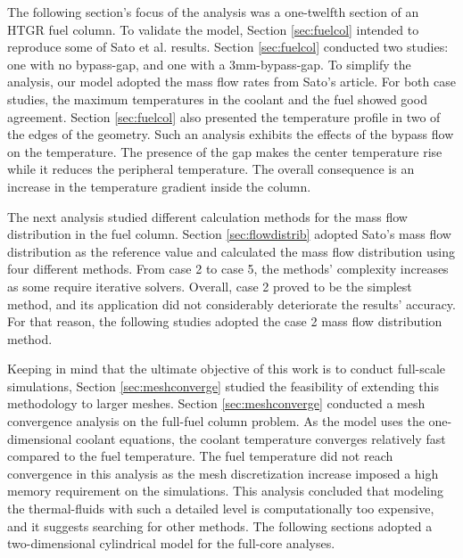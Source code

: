The following section's focus of the analysis was a one-twelfth section of an HTGR fuel column.
To validate the model, Section \ref{sec:fuelcol} intended to reproduce some of Sato et al. \cite{sato_computational_2010} results.
Section \ref{sec:fuelcol} conducted two studies: one with no bypass-gap, and one with a 3mm-bypass-gap.
To simplify the analysis, our model adopted the mass flow rates from Sato's article.
For both case studies, the maximum temperatures in the coolant and the fuel showed good agreement.
Section \ref{sec:fuelcol} also presented the temperature profile in two of the edges of the geometry.
Such an analysis exhibits the effects of the bypass flow on the temperature.
The presence of the gap makes the center temperature rise while it reduces the peripheral temperature.
The overall consequence is an increase in the temperature gradient inside the column.

The next analysis studied different calculation methods for the mass flow distribution in the fuel column.
Section \ref{sec:flowdistrib} adopted Sato's mass flow distribution as the reference value and calculated the mass flow distribution using four different methods.
From case 2 to case 5, the methods' complexity increases as some require iterative solvers.
Overall, case 2 proved to be the simplest method, and its application did not considerably deteriorate the results' accuracy.
For that reason, the following studies adopted the case 2 mass flow distribution method.

Keeping in mind that the ultimate objective of this work is to conduct full-scale simulations, Section \ref{sec:meshconverge} studied the feasibility of extending this methodology to larger meshes.
Section \ref{sec:meshconverge} conducted a mesh convergence analysis on the full-fuel column problem.
As the model uses the one-dimensional coolant equations, the coolant temperature converges relatively fast compared to the fuel temperature.
The fuel temperature did not reach convergence in this analysis as the mesh discretization increase imposed a high memory requirement on the simulations.
This analysis concluded that modeling the thermal-fluids with such a detailed level is computationally too expensive, and it suggests searching for other methods.
The following sections adopted a two-dimensional cylindrical model for the full-core analyses.


